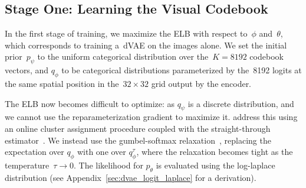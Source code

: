 \documentclass{article}
\newcommand{\given}{\,|\,}{}
\begin{document}
%
\subsection{Stage One: Learning the Visual Codebook}

In the first stage of training, we maximize the ELB with respect to~$\phi$ and~$\theta$, which corresponds to training a~dVAE on the images alone. We set the initial prior~$p_\psi$ to the uniform categorical distribution over the~$K = \num{8192}$ codebook vectors, and $q_\phi$ to be categorical distributions parameterized by the~\num{8192} logits at the same spatial position in the~$32 \times 32$ grid output by the encoder.

The ELB now becomes difficult to optimize: as $q_\psi$ is a discrete distribution, and we cannot use the reparameterization gradient to maximize it. \citet{oord2017neural,razavi2019generating} address this using an online cluster assignment procedure coupled with the straight-through estimator~\cite{bengio2013estimating}. We instead use the gumbel-softmax relaxation~\cite{jang2016categorical,maddison2016concrete}, replacing the expectation over $q_\phi$ with one over $q^\tau_\phi$, where the relaxation becomes tight as the temperature~$\tau \to 0$. The likelihood for $p_\theta$ is evaluated using the log-laplace distribution (see Appendix~\ref{sec:dvae_logit_laplace} for a derivation).
\end{document}
